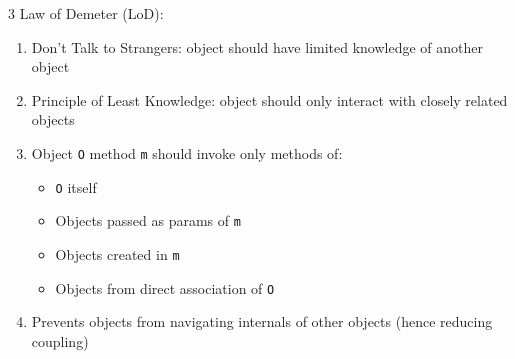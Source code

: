\documentclass[12pt, a4paper]{article}
\begin{document}
\begin{multicols*}{3}
Law of Demeter (LoD):
\begin{enumerate}[\roman*.]
  \item  Don't Talk to Strangers: object should have limited knowledge of another object
  \item Principle of Least Knowledge: object should only interact with closely related objects 
  \item Object \lstinline|O| method \lstinline|m| should invoke only methods of:
    \begin{itemize}[leftmargin=*]\vspace{3pt}
      \item \lstinline|O| itself
      \item Objects passed as params of \lstinline|m|
      \item Objects created in \lstinline|m|
      \item Objects from direct association of \lstinline|O|
    \end{itemize}
  \item Prevents objects from navigating internals of other objects (hence reducing coupling)
\end{enumerate}
\end{multicols*}
\end{document}
